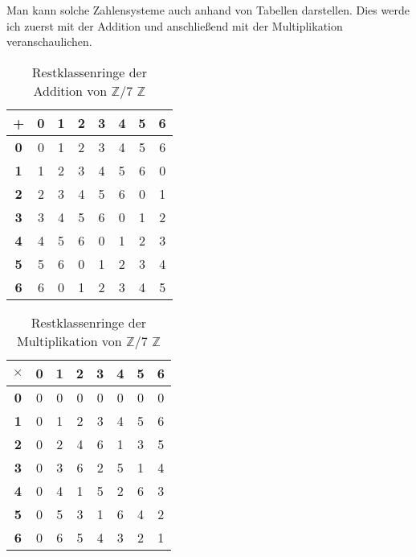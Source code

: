 \documentclass[german,12pt,a4paper]{article}
\begin{document}
Man kann solche Zahlensysteme auch anhand von Tabellen darstellen.
Dies werde ich zuerst mit der Addition und anschließend mit der Multiplikation veranschaulichen.
\begin{table}[h]\begin{center}
\begin{tabular}{c|c|c|c|c|c|c|c}
\textbf{+} & \textbf{0} & \textbf{1} & \textbf{2} & \textbf{3} & \textbf{4} & \textbf{5} & \textbf{6} \\
\hline
\textbf{0} & 0 & 1 & 2 & 3 & 4 & 5 & 6 \\
\hline
\textbf{1} & 1 & 2 & 3 & 4 & 5 & 6 & 0 \\
\hline
\textbf{2} & 2 & 3 & 4 & 5 & 6 & 0 & 1 \\
\hline
\textbf{3} & 3 & 4 & 5 & 6 & 0 & 1 & 2 \\
\hline
\textbf{4} & 4 & 5 & 6 & 0 & 1 & 2 & 3 \\
\hline
\textbf{5} & 5 & 6 & 0 & 1 & 2 & 3 & 4 \\
\hline
\textbf{6} & 6 & 0 & 1 & 2 & 3 & 4 & 5
\end{tabular}\end{center}
\caption{Restklassenringe der Addition von $\mathbb{Z}$/7 $\mathbb{Z}$}
\label{tab:Restklassenringe der Addition}
\end{table}

\begin{table}[h]\begin{center}
\begin{tabular}{c|c|c|c|c|c|c|c}
\textbf{$\times$} & \textbf{0} & \textbf{1} & \textbf{2} & \textbf{3} & \textbf{4} & \textbf{5} & \textbf{6} \\
\hline
\textbf{0} & 0 & 0 & 0 & 0 & 0 & 0 & 0 \\
\hline
\textbf{1} & 0 & 1 & 2 & 3 & 4 & 5 & 6 \\
\hline
\textbf{2} & 0 & 2 & 4 & 6 & 1 & 3 & 5 \\
\hline
\textbf{3} & 0 & 3 & 6 & 2 & 5 & 1 & 4 \\
\hline
\textbf{4} & 0 & 4 & 1 & 5 & 2 & 6 & 3 \\
\hline
\textbf{5} & 0 & 5 & 3 & 1 & 6 & 4 & 2 \\
\hline
\textbf{6} & 0 & 6 & 5 & 4 & 3 & 2 & 1
\end{tabular}\end{center}
\caption{Restklassenringe der Multiplikation von $\mathbb{Z}$/7 $\mathbb{Z}$}
\label{tab:Restklassenringe der Multiplikation}
\end{table}
\end{document}
